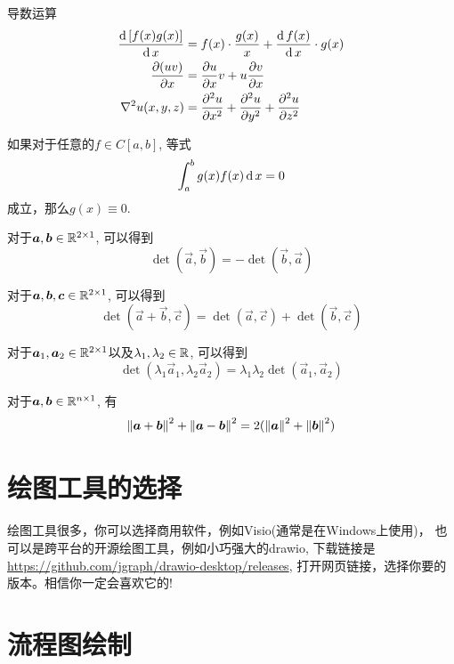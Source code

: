 \begin{example} 导数运算
\begin{align}
\frac{\operatorname{\mathrm{d}} {[f(x)g(x)]}}{\operatorname{\mathrm{d}} {x}} 
&= f(x)\cdot \frac{g(x)}{x} + \frac{\operatorname{\mathrm{d}} {f(x)}}{\operatorname{\mathrm{d}} {x}}\cdot g(x) \\
\frac{\partial {(uv)}}{\partial {x}}& = \frac{\partial {u}}{\partial {x}}v + u\frac{\partial {v}}{\partial {x}}\\
\nabla^2u(x,y,z)& = \frac{\partial^2 {u}}{\partial {x}^2} + \frac{\partial^2 {u}}{\partial {y}^2} +\frac{\partial^2 {u}}{\partial {z}^2}
\end{align}
\end{example}

\begin{lemma} 如果对于任意的$f\in C[a,b]$, 等式
$$
\int^b_a g(x) f(x)\operatorname{\mathrm{d}} x = 0
$$
成立，那么$g(x)\equiv 0$.
\end{lemma}

\begin{property}[反对称性]
对于$\bm{a},\bm{b}\in \mathbb{R}^{{2}\times {1}}$, 可以得到
$$
\det(\vec{a},\vec{b}) = - \det(\vec{b},\vec{a})
$$
\end{property}

\begin{property}[可加性]
对于$\bm{a},\bm{b},\bm{c}\in \mathbb{R}^{{2}\times {1}}$, 可以得到
$$
\det(\vec{a}+\vec{b},\vec{c}) = \det(\vec{a},\vec{c}) +\det(\vec{b},\vec{c})
$$
\end{property}

\begin{property}[多重线性]
对于$\bm{a}_1,\bm{a}_2\in \mathbb{R}^{{2}\times {1}}$以及$\lambda_1, \lambda_2\in\mathbb{R}$, 可以得到
$$
\det(\lambda_1\vec{a}_1,\lambda_2\vec{a}_2) = \lambda_1\lambda_2 \det(\vec{a}_1,\vec{a}_2)
$$
\end{property}


\begin{corollary}
对于$\bm{a},\bm{b}\in \mathbb{R}^{{n}\times {1}}$, 有
$$
\left\lVert \bm{a}+\bm{b} \right\rVert^2 + \left\lVert \bm{a}-\bm{b} \right\rVert^2 =2(\left\lVert \bm{a} \right\rVert^2 +\left\lVert \bm{b} \right\rVert^2)
$$
\end{corollary}


\section{绘图工具的选择}

绘图工具很多，你可以选择商用软件，例如Visio(通常是在Windows上使用)， 也可以是跨平台的开源绘图工具，例如小巧强大的drawio, 下载链接是\url{https://github.com/jgraph/drawio-desktop/releases}, 打开网页链接，选择你要的版本。相信你一定会喜欢它的!


\section{流程图绘制}
